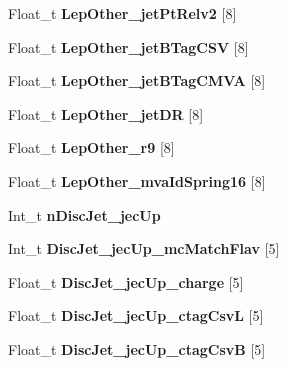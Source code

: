 \begin{DoxyCompactItemize}
\hypertarget{classMiniTree_a389a36cf83e878be795b2104506f4fd4}{}\label{classMiniTree_a389a36cf83e878be795b2104506f4fd4} 
Float\+\_\+t {\bfseries Lep\+Other\+\_\+jet\+Pt\+Relv2} \mbox{[}8\mbox{]}
\item 
\hypertarget{classMiniTree_ad3cdbf9242891ffa40156eae3502f84e}{}\label{classMiniTree_ad3cdbf9242891ffa40156eae3502f84e} 
Float\+\_\+t {\bfseries Lep\+Other\+\_\+jet\+B\+Tag\+C\+SV} \mbox{[}8\mbox{]}
\item 
\hypertarget{classMiniTree_ae56d465b91b8392ae6abd6ae2c9f16da}{}\label{classMiniTree_ae56d465b91b8392ae6abd6ae2c9f16da} 
Float\+\_\+t {\bfseries Lep\+Other\+\_\+jet\+B\+Tag\+C\+M\+VA} \mbox{[}8\mbox{]}
\item 
\hypertarget{classMiniTree_aaae00aa0db05533d82992aad857603f8}{}\label{classMiniTree_aaae00aa0db05533d82992aad857603f8} 
Float\+\_\+t {\bfseries Lep\+Other\+\_\+jet\+DR} \mbox{[}8\mbox{]}
\item 
\hypertarget{classMiniTree_a423b8a8737c15fbcf64ad49886a45df9}{}\label{classMiniTree_a423b8a8737c15fbcf64ad49886a45df9} 
Float\+\_\+t {\bfseries Lep\+Other\+\_\+r9} \mbox{[}8\mbox{]}
\item 
\hypertarget{classMiniTree_a91756991f7ef32894f16d3c6839f1f09}{}\label{classMiniTree_a91756991f7ef32894f16d3c6839f1f09} 
Float\+\_\+t {\bfseries Lep\+Other\+\_\+mva\+Id\+Spring16} \mbox{[}8\mbox{]}
\item 
\hypertarget{classMiniTree_a7acf9827ea008a184d8248b6245dc19e}{}\label{classMiniTree_a7acf9827ea008a184d8248b6245dc19e} 
Int\+\_\+t {\bfseries n\+Disc\+Jet\+\_\+jec\+Up}
\item 
\hypertarget{classMiniTree_a2b541dfdedb798d5e14e87c9cd329726}{}\label{classMiniTree_a2b541dfdedb798d5e14e87c9cd329726} 
Int\+\_\+t {\bfseries Disc\+Jet\+\_\+jec\+Up\+\_\+mc\+Match\+Flav} \mbox{[}5\mbox{]}
\item 
\hypertarget{classMiniTree_a3e2337ee612e0f0e9d11b6d7c72459e1}{}\label{classMiniTree_a3e2337ee612e0f0e9d11b6d7c72459e1} 
Float\+\_\+t {\bfseries Disc\+Jet\+\_\+jec\+Up\+\_\+charge} \mbox{[}5\mbox{]}
\item 
\hypertarget{classMiniTree_aaa9c3f1a6e87e5f5c1e31a761c7beda1}{}\label{classMiniTree_aaa9c3f1a6e87e5f5c1e31a761c7beda1} 
Float\+\_\+t {\bfseries Disc\+Jet\+\_\+jec\+Up\+\_\+ctag\+CsvL} \mbox{[}5\mbox{]}
\item 
\hypertarget{classMiniTree_a8b647250279c85ab208c5fae1ea89ecb}{}\label{classMiniTree_a8b647250279c85ab208c5fae1ea89ecb} 
Float\+\_\+t {\bfseries Disc\+Jet\+\_\+jec\+Up\+\_\+ctag\+CsvB} \mbox{[}5\mbox{]}

\end{DoxyCompactItemize}
